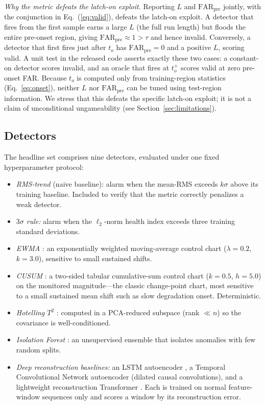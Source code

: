 \documentclass[IJPHM, 2026, 0]{PHMSociety}
\begin{document}
\emph{Why the metric defeats the latch-on exploit.} Reporting $L$ and $\text{FAR}_{\text{pre}}$ jointly, with the conjunction in Eq.~(\ref{eq:valid}), defeats the latch-on exploit. A detector that fires from the first sample earns a large $L$ (the full run length) but floods the entire pre-onset region, giving $\text{FAR}_{\text{pre}} \approx 1 > \tau$ and hence invalid. Conversely, a detector that first fires just after $t_o$ has $\text{FAR}_{\text{pre}}=0$ and a positive $L$, scoring valid. A unit test in the released code asserts exactly these two cases: a constant-on detector scores invalid, and an oracle that fires at $t_o^+$ scores valid at zero pre-onset FAR. Because $t_o$ is computed only from training-region statistics (Eq.~\ref{eq:onset}), neither $L$ nor $\text{FAR}_{\text{pre}}$ can be tuned using test-region information. We stress that this defeats the specific latch-on exploit; it is not a claim of unconditional ungameability (see Section~\ref{sec:limitations}).

\subsection{Detectors}
The headline set comprises nine detectors, evaluated under one fixed hyperparameter protocol:
\begin{itemize}
\item \emph{RMS-trend} (naive baseline): alarm when the mean-RMS exceeds $k\sigma$ above its training baseline. Included to verify that the metric correctly penalizes a weak detector.
\item \emph{$3\sigma$ rule:} alarm when the $\ell_2$-norm health index exceeds three training standard deviations.
\item \emph{EWMA} \cite{roberts1959control}: an exponentially weighted moving-average control chart ($\lambda=0.2$, $k=3.0$), sensitive to small sustained shifts.
\item \emph{CUSUM} \cite{page1954continuous}: a two-sided tabular cumulative-sum control chart ($k=0.5$, $h=5.0$) on the monitored magnitude---the classic change-point chart, most sensitive to a small sustained mean shift such as slow degradation onset. Deterministic.
\item \emph{Hotelling $T^2$} \cite{hotelling1947multivariate}: computed in a PCA-reduced subspace (rank $\ll n$) so the covariance is well-conditioned.
\item \emph{Isolation Forest} \cite{liu2008isolation}: an unsupervised ensemble that isolates anomalies with few random splits.
\item \emph{Deep reconstruction baselines:} an LSTM autoencoder \cite{malhotra2016lstm}, a Temporal Convolutional Network autoencoder (dilated causal convolutions), and a lightweight reconstruction Transformer \cite{vaswani2017attention}. Each is trained on normal feature-window sequences only and scores a window by its reconstruction error.
\end{itemize}
\end{document}
